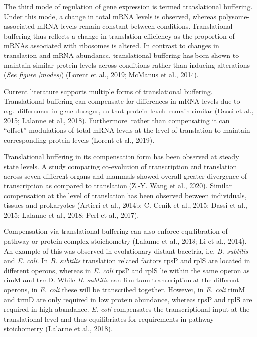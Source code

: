 \documentclass[12pt,openany]{book}
\begin{document}
The third mode of regulation of gene expression is termed translational
buffering. Under this mode, a change in total mRNA levels is observed,
whereas polysome-associated mRNA levels remain constant between
conditions. Translational buffering thus reflects a change in
translation efficiency as the proportion of mRNAs associated with
ribosomes is altered. In contrast to changes in translation and mRNA
abundance, translational buffering has been shown to maintain similar
protein levels across conditions rather than inducing alterations
(\emph{See figure \ref{modes}}) (Lorent et al., 2019; McManus et al.,
2014).

Current literature supports multiple forms of translational buffering.
Translational buffering can compensate for differences in mRNA levels
due to e.g.~differences in gene dosages, so that protein levels remain
similar (Dassi et al., 2015; Lalanne et al., 2018). Furthermore, rather
than compensating it can ``offset'' modulations of total mRNA levels at
the level of translation to maintain corresponding protein levels
(Lorent et al., 2019).

Translational buffering in its compensation form has been observed at
steady state levels. A study comparing co-evolution of transcription and
translation across seven different organs and mammals showed overall
greater divergence of transcription as compared to translation (Z.-Y.
Wang et al., 2020). Similar compensation at the level of translation has
been observed between individuals, tissues and prokaryotes (Artieri et
al., 2014b; C. Cenik et al., 2015; Dassi et al., 2015; Lalanne et al.,
2018; Perl et al., 2017).

Compensation via translational buffering can also enforce equilibration
of pathway or protein complex stoichometry (Lalanne et al., 2018; Li et
al., 2014). An example of this was observed in evolutionary distant
bacetria, i.e. \emph{B. subtilis} and \emph{E. coli}. In \emph{B.
subtilis} translation related factors rpsP and rplS are located in
different operons, whereas in \emph{E. coli} rpsP and rplS lie within
the same operon as rimM and trmD. While \emph{B. subtilis} can fine tune
transcription at the different operons, in \emph{E. coli} these will be
transcribed together. However, in \emph{E. coli} rimM and trmD are only
required in low protein abundance, whereas rpsP and rplS are required in
high abundance. \emph{E. coli} compensates the transcriptional input at
the translational level and thus equilibriates for requirements in
pathway stoichometry (Lalanne et al., 2018).
\end{document}
